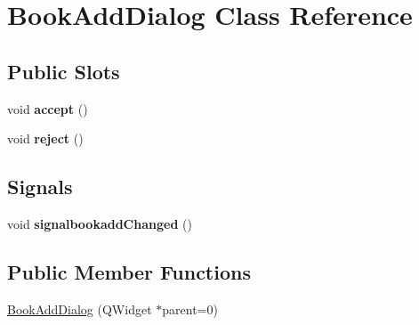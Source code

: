 \hypertarget{classBookAddDialog}{
\section{BookAddDialog Class Reference}
\label{classBookAddDialog}
}
\subsection*{Public Slots}
\begin{DoxyCompactItemize}
\item 
\hypertarget{classBookAddDialog_a194f8d4f03571b706a772cc3852b2bd5}{
void {\bfseries accept} ()}
\label{classBookAddDialog_a194f8d4f03571b706a772cc3852b2bd5}

\item 
\hypertarget{classBookAddDialog_a10bfc83083a4a13e0316a6433ed487a4}{
void {\bfseries reject} ()}
\label{classBookAddDialog_a10bfc83083a4a13e0316a6433ed487a4}

\end{DoxyCompactItemize}
\subsection*{Signals}
\begin{DoxyCompactItemize}
\item 
\hypertarget{classBookAddDialog_ab295d161c06a2489f5ce8f7ec2dc99e8}{
void {\bfseries signalbookaddChanged} ()}
\label{classBookAddDialog_ab295d161c06a2489f5ce8f7ec2dc99e8}

\end{DoxyCompactItemize}
\subsection*{Public Member Functions}
\begin{DoxyCompactItemize}
\item 
\hyperlink{classBookAddDialog_a5db580fd3ac3b3120c6d588b5f9ec63e}{BookAddDialog} (QWidget $\ast$parent=0)
\end{DoxyCompactItemize}
